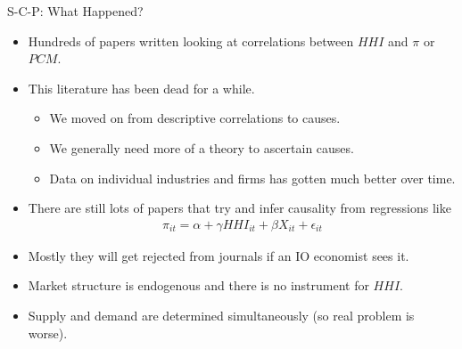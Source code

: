 \begin{frame}{S-C-P: What Happened?}
\begin{itemize}
\item Hundreds of papers written looking at correlations between $HHI$ and $\pi$ or $PCM$.
\item This literature has been dead for a while.
\begin{itemize}
\item We moved on from descriptive correlations to causes.
\item We generally need more of a theory to ascertain causes.
\item Data on individual industries and firms has gotten much better over time.
\end{itemize}
\item There are still lots of papers that try and infer causality from regressions like 
\begin{eqnarray*}
\pi_{it} = \alpha + \gamma HHI_{it} + \beta X_{it} + \epsilon_{it} 
\end{eqnarray*}
\item Mostly they will get rejected from journals if an IO economist sees it.
\item Market structure is \alert{endogenous} and there is no instrument for $HHI$.
\item Supply and demand are determined \alert{simultaneously} (so real problem is worse).
\end{itemize}
\end{frame}


